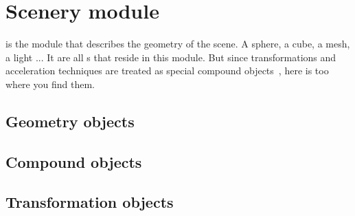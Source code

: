 % 

\chapter{Scenery module}

 is the module that describes the geometry of the scene.  A sphere, a cube, a mesh, a light ...  It are all s that reside in this module.  But since transformations and acceleration techniques are treated as special compound objects~\cite{kirk88ray}, here is too where you find them.

\section{Geometry objects}

\section{Compound objects}

\section{Transformation objects}